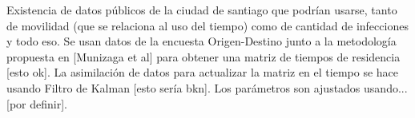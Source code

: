 \begin{intro}
Existencia de datos públicos de la ciudad de santiago que podrían usarse, tanto de movilidad (que se relaciona al uso del tiempo) como de cantidad de infecciones y todo eso. 
Se usan datos de la encuesta Origen-Destino junto a la metodología propuesta en [Munizaga et al] para obtener una matriz de tiempos de residencia [esto ok]. La asimilación de datos para actualizar la matriz en el tiempo se hace usando Filtro de Kalman [esto sería bkn]. Los parámetros son ajustados usando... [por definir]. 


\end{intro}

%
%




